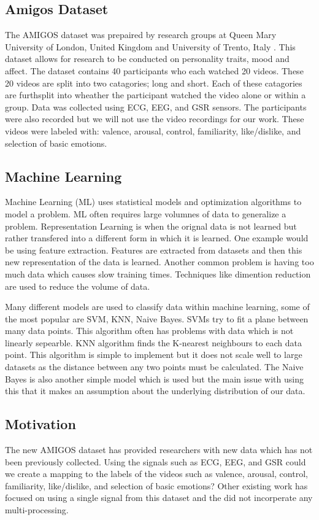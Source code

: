 \subsection{Amigos Dataset}
The AMIGOS dataset was prepaired by research groups at
Queen Mary University of London, United Kingdom and
University of Trento, Italy \cite{AMIGOS:2018}.
This dataset allows for research to be conducted on
personality traits, mood and affect.
The dataset contains 40 participants who each watched 20 videos.
These 20 videos are split into two catagories; long and short.
Each of these catagories are furthsplit into
wheather the participant watched the video alone or within a group.
Data was collected using ECG, EEG, and GSR sensors.
The participants were also recorded but we will not use the video recordings
for our work.
These videos were labeled with:
valence, arousal, control, familiarity, like/dislike,
and selection of basic emotions.

\subsection{Machine Learning}
Machine Learning (ML) uses statistical models and
optimization algorithms to model a problem.
ML often requires large volumnes of data to generalize a problem.
Representation Learning is when the orignal data is not learned
but rather transfered into a different form in which it is learned.
One example would be using feature extraction.
Features are extracted from datasets and then this new representation of the data
is learned.
Another common problem is having too much data which causes slow training times.
Techniques like dimention reduction are used to reduce the volume of
data.

Many different models are used to classify data within machine learning,
some of the most popular are SVM, KNN, Naive Bayes.
SVMs try to fit a plane between many data points.
This algorithm often has problems with data which is not
linearly sepearble.
KNN algorithm finds the K-nearest neighbours to each data point.
This algorithm is simple to implement but it does not scale well
to large datasets as the distance between any two points must be calculated.
The Naive Bayes is also another simple model which is used but the main issue
with using this that it makes an assumption about the underlying distribution of
our data.

\subsection{Motivation}
The new AMIGOS dataset has provided researchers with new
data which has not been previously collected.
Using the signals such as ECG, EEG, and GSR
could we create a mapping to the
labels of the videos such as
valence, arousal, control, familiarity, like/dislike,
and selection of basic emotions?
Other existing work has focused on using a single signal from this dataset
and the did not incorperate any multi-processing.



